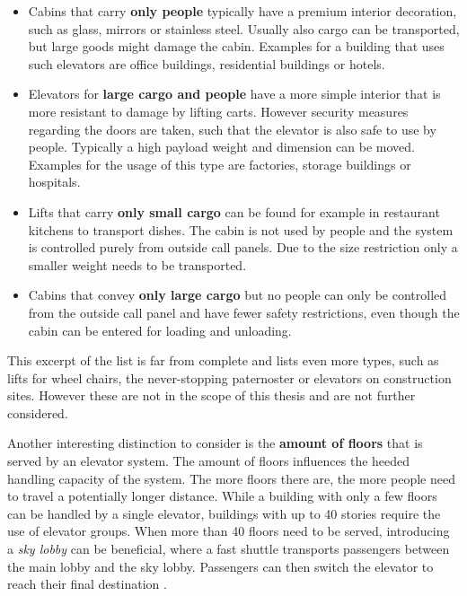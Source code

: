 \begin{itemize}
    \item Cabins that carry \textbf{only people} 
    typically have a premium interior decoration, such as glass, mirrors or stainless steel.
    Usually also cargo can be transported, but large goods might damage the cabin.
    Examples for a building that uses such elevators are office buildings, residential buildings or hotels.
    
    \item Elevators for \textbf{large cargo and people} 
    have a more simple interior that is more resistant to damage by lifting carts. 
    However security measures regarding the doors are taken, such that the elevator is also safe to use by people. 
    Typically a high payload weight and dimension can be moved.
    Examples for the usage of this type are factories, storage buildings or hospitals. 
    
    \item Lifts that carry \textbf{only small cargo} can be found for example in restaurant kitchens to transport dishes.
    The cabin is not used by people and the system is controlled purely from outside call panels. 
    Due to the size restriction only a smaller weight needs to be transported.
    
    \item Cabins that convey \textbf{only large cargo} but no people can only be controlled from the outside call panel and have fewer safety restrictions, even though the cabin can be entered for loading and unloading. 
\end{itemize}

This excerpt of the list is far from complete and \textcite[][pp.~141--158]{unger2015aufzuege} lists even more types, 
such as lifts for wheel chairs, the never-stopping paternoster or elevators on construction sites.
However these are not in the scope of this thesis and are not further considered.

Another interesting distinction to consider is the \textbf{amount of floors} that is served by an elevator system.
The amount of floors influences the heeded handling capacity of the system.
The more floors there are, the more people need to travel a potentially longer distance.
While a building with only a few floors can be handled by a single elevator,
buildings with up to 40 stories require the use of elevator groups.
When more than 40 floors need to be served, 
introducing a \emph{sky lobby} can be beneficial, 
where a fast shuttle transports passengers between the main lobby and the sky lobby. Passengers can then switch the elevator to reach their final destination \autocite[][p.~9]{hakonen2003simulation}.

